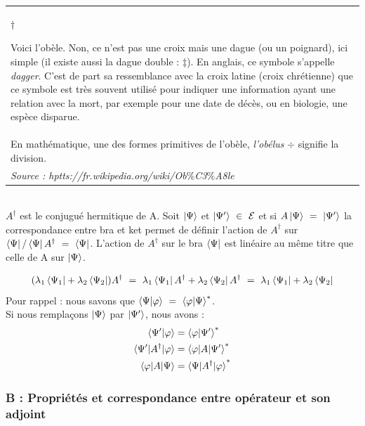 \documentclass[12pt,a4paper,titlepage]{book}
\begin{document}
\begin{tabular}{|p{15cm}|}
\hline
\begin{center}
{\Huge{$\dagger$}}
\end{center}
Voici l'obèle. Non, ce n'est pas une croix mais une dague (ou un poignard), ici simple (il existe aussi la dague double : $\ddagger$). En anglais, ce symbole s'appelle \textit{dagger}. C'est de part sa ressemblance avec la croix latine (croix chrétienne) que ce symbole est très souvent utilisé pour indiquer une information ayant une relation avec la mort, par exemple pour une date de décès, ou en biologie, une espèce disparue.\\

En mathématique, une des formes primitives de l'obèle, \textit{l'obélus} $\div$ signifie la division.\\

\textit{Source : hptts://fr.wikipedia.org/wiki/Ob$\%$C3$\%$A8le}\\
\hline
\end{tabular}\\

$A^{\dagger}$ est le conjugué hermitique de A. Soit $\ket{\Psi}$ et $\ket{\Psi'} ~\in~ \mathcal{E}$ et si $A \ket{\Psi} ~=~ \ket{\Psi'}$ la correspondance entre bra et ket permet de définir l'action de $A^\dagger$ sur $\bra{\Psi} / \bra{\Psi} A^\dagger ~=~ \bra{\Psi}$. L'action de $A^\dagger$ sur le bra $\bra{\Psi}$ est linéaire au même titre que celle de A sur $\ket{\Psi}$.

\begin{equation*}
(\lambda_1 \bra{\Psi_1} + \lambda_2 \bra{\Psi_2}) A^\dagger ~=~ \lambda_1 \bra{\Psi_1} A^\dagger + \lambda_2 \bra{\Psi_2} A^\dagger ~=~ \lambda_1 \bra{\Psi_1} + \lambda_2 \bra{\Psi_2}
\end{equation*}
Pour rappel : nous savons que $\braket{\Psi | \varphi} ~=~ \braket{\varphi | \Psi}^*$.\\

Si nous remplaçons $\ket{\Psi}$ par $\ket{\Psi'}$, nous avons :\\
\begin{align*}
\braket{\Psi' | \varphi} &= \braket{\varphi | \Psi'}^*\\
\braket{\Psi' |A^{\dagger}| \varphi} &= \braket{\varphi |A| \Psi'}^*\\
\braket{\varphi |A| \Psi} &= \braket{\Psi |A^{\dagger}| \varphi}^*
\end{align*}

\subsubsection{B : Propriétés et correspondance entre opérateur et son adjoint}
\end{document}
